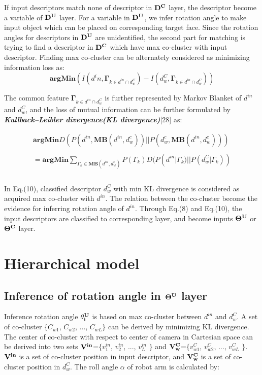 \documentclass[journal]{IEEEtran}
\begin{document}
If input descriptors match none of descriptor in $\bf{D^C}$ layer, the descriptor become a variable of  $\bf{D^U}$ layer. For a variable in $\bf{D^U}$, we infer rotation angle to make input object which can be placed on corresponding target face. Since the rotation angles for descriptors in $\bf{D^U}$ are unidentified, the second part for matching is trying to find a descriptor in $\bf{D^C}$ which have max co-cluster with input descriptor. Finding max co-cluster can be alternately considered as minimizing information loss as:
\begin{equation}
\mathbf{argMin}(I(d^in , \mathbf{\Gamma}_{k \in d^{in} \cap d^C_w}) - I(d^C_w , \mathbf{\Gamma}_{k \in d^{in} \cap d^C_w}))
\end{equation}

The common feature $\mathbf{\Gamma}_{k \in d^{in} \cap d^C_w}$ is further represented by Markov Blanket of $d^{in}$ and $d^C_w$, and the loss of mutual information can be further formulated by \textbf{\textit{Kullback–Leibler divergence(KL divergence)}}[28] as:

\begin{equation}
\begin{array}{ll}
\mathbf{argMin}D(P(d^{in} , \mathbf{MB}(d^{in},d^c_w))||P(d^c_w , \mathbf{MB}(d^{in},d^c_w)))\\\\
= \mathbf{argMin}\sum_{\Gamma_k\in\mathbf{MB}(d^{in},d^c_w)}P(\Gamma_k)D(P(d^{in}|\Gamma_k)||P(d^C_w|\Gamma_k))\\\\
\end{array}
\end{equation}

In Eq.(10), classified descriptor $d^C_w$ with min KL divergence is considered as acquired max co-cluster with $d^{in}$. The relation between the co-cluster become the evidence for inferring rotation angle of $d^{in}$. Through Eq.(8) and Eq.(10), the input descriptors are classified to corresponding layer, and become inputs $\bf{\Theta^{U}}$ or $\bf{\Theta^{C}}$ layer.


\section{Hierarchical model}
\subsection{Inference of rotation angle in $\bf{\Theta^{U}}$ layer}
Inference rotation angle $\bf{\theta^{U}_i}$ is based on max co-cluster between $d^{in}$ and $d^C_w$. A set of co-cluster $\{$$C_{w1}$, $C_{w2}$, ..., $C_{wL}$$\}$ can be derived by minimizing KL divergence. The center of co-cluster with respect to center of camera in Cartesian space can be derived into two sets $\bf{V^{in}}$=$\{$$v^{in}_1$, $v^{in}_2$, ..., $v^{in}_L$ $\}$ and $\bf{V^{C}_w}$=$\{$$v^{C}_{w1}$, $v^{C}_{w2}$, ..., $v^{C}_{wL}$ $\}$. $\bf{V^{in}}$ is a set of co-cluster position in input descriptor, and $\bf{V^{C}_w}$ is a set of co-cluster position in $d^C_w$. The roll angle $\alpha$ of robot arm is calculated by:
\end{document}
